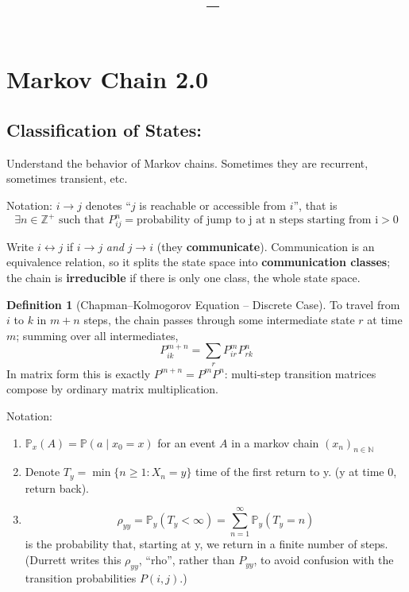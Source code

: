 \documentclass[11pt]{article}
\title{\vspace{-1.5em}\textbf{\coursename\ -- \lecturetitle}}
\author{\studentname}
\date{\lecturedate}
\newcommand{\1}{\mathbf{1}}
\theoremstyle{notestyle}
\theoremstyle{definition}
\newtheorem{definition}[theorem]{Definition}
\begin{document}
\maketitle

\section{Markov Chain 2.0}
\subsection{Classification of States:}
Understand the behavior of Markov chains. Sometimes they are recurrent, sometimes
transient, etc.
\par Notation: $i \rightarrow j$ denotes ``$j$ is reachable or accessible from $i$'',
that is
$$\exists n\in \mathbb{Z}^{+} \text{ such that } P_{ij}^{n} = \text{
probability of jump to j at n steps starting from i} > 0$$
\par Write $i \leftrightarrow j$ if $i \rightarrow j$ \emph{and} $j \rightarrow i$
(they \textbf{communicate}). Communication is an equivalence relation, so it splits
the state space into \textbf{communication classes}; the chain is
\textbf{irreducible} if there is only one class, the whole state space.
\begin{definition}[Chapman--Kolmogorov Equation -- Discrete Case]
\label{def:label}
To travel from $i$ to $k$ in $m + n$ steps, the chain passes through some
intermediate state $r$ at time $m$; summing over all intermediates,
$$P_{ik}^{m + n} = \sum_{r} P_{ir}^{m}P_{rk}^{n}$$
In matrix form this is exactly $P^{m+n} = P^{m} P^{n}$: multi-step transition
matrices compose by ordinary matrix multiplication.
\end{definition}
Notation:
\begin{enumerate}
    \item $\mathbb{P}_x(A) = \mathbb P(a \mid x_0 = x)$ for an event $A$ in a markov
        chain $(x_n)_{n \in \mathbb{N}}$
    \item Denote $T_y = \min\{n \ge 1 : X_n = y\}$  time of the first return to y. (y at
        time 0, return back).
    \item $$\rho_{yy} = \mathbb{P}_{y}(T_y < \infty) =
    \sum_{n=1}^{\infty}\mathbb{P}_y(T_y = n)$$  is the probability that, starting at
    y, we return in a finite number of steps. (Durrett writes this $\rho_{yy}$,
    ``rho'', rather than $P_{yy}$, to avoid confusion with the transition
    probabilities $P(i,j)$.)
\end{enumerate}
\end{document}
